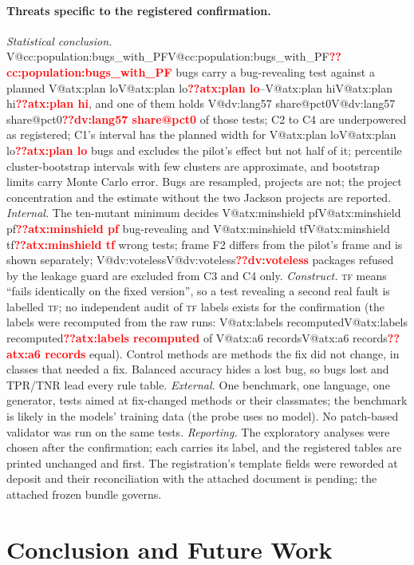 \documentclass[pdflatex,iicol,sn-mathphys-num]{sn-jnl}
\makeatletter
\newcommand{\V}[1]{\ifcsname V@#1\endcsname\csname V@#1\endcsname\else\textbf{\textcolor{red}{??#1}}\fi}
\newcommand{\TF}{\textsc{tf}}
\makeatother
\begin{document}
\paragraph{Threats specific to the registered confirmation.} \textit{Statistical conclusion.} \V{cc:population:bugs_with_PF} bugs carry a bug-revealing test against a planned \V{atx:plan lo}--\V{atx:plan hi}, and one of them holds \V{dv:lang57 share@pct0} of those tests; C2 to C4 are underpowered as registered; C1's interval has the planned width for \V{atx:plan lo} bugs and excludes the pilot's effect but not half of it; percentile cluster-bootstrap intervals with few clusters are approximate, and bootstrap limits carry Monte Carlo error. Bugs are resampled, projects are not; the project concentration and the estimate without the two Jackson projects are reported. \textit{Internal.} The ten-mutant minimum decides \V{atx:minshield pf} bug-revealing and \V{atx:minshield tf} wrong tests; frame F2 differs from the pilot's frame and is shown separately; \V{dv:voteless} packages refused by the leakage guard are excluded from C3 and C4 only. \textit{Construct.} \TF{} means ``fails identically on the fixed version'', so a test revealing a second real fault is labelled \TF; no independent audit of \TF{} labels exists for the confirmation (the labels were recomputed from the raw runs: \V{atx:labels recomputed} of \V{atx:a6 records} equal). Control methods are methods the fix did not change, in classes that needed a fix. Balanced accuracy hides a lost bug, so bugs lost and TPR/TNR lead every rule table. \textit{External.} One benchmark, one language, one generator, tests aimed at fix-changed methods or their classmates; the benchmark is likely in the models' training data (the probe uses no model). No patch-based validator was run on the same tests. \textit{Reporting.} The exploratory analyses were chosen after the confirmation; each carries its label, and the registered tables are printed unchanged and first. The registration's template fields were reworded at deposit and their reconciliation with the attached document is pending; the attached frozen bundle governs.

\section{Conclusion and Future Work}\label{sec:conclusion}
\end{document}

